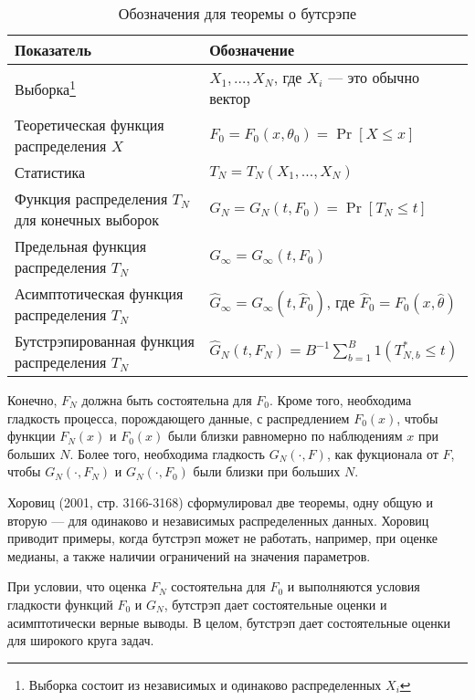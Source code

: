 \begin{table}[h]
\begin{center}
\caption{\label{tab:pred} Обозначения для теоремы о бутсрэпе}
\begin{minipage}{\textwidth}
\begin{tabular}{ll}
\hline
\hline
Показатель & Обозначение \\ 
\hline 
Выборка\footnote{Выборка состоит из независимых и одинаково распределенных $X_i$} & $X_1, \ldots, X_N$, где $X_i$ --- это обычно вектор \\ 
Теоретическая функция распределения $X$ & $F_0 = F_0(x, \theta_0) = \Pr[X \leq x]$ \\
Статистика & $T_N = T_N(X_1, \ldots, X_N)$ \\
Функция распределения $T_N$ для конечных выборок & $G_N = G_N(t, F_0) = \Pr[T_N \leq t]$ \\
Предельная функция распределения $T_N$ & $G_{\infty} = G_{\infty}(t, F_0)$ \\
Асимптотическая функция распределения $T_N$ & $\hat{G}_{\infty} = G_{\infty}(t, \hat{F}_0)$, где $\hat{F}_0 = F_0(x, \hat{\theta})$ \\
Бутстрэпированная функция распределения $T_N$ & $\hat{G}_N(t, F_N) = B^{-1} \sum_{b=1}^B 1(T^*_{N,b} \leq t)$ \\
\hline
\hline
\end{tabular}
\end{minipage}
\end{center}
\end{table} 

Конечно, $F_N$ должна быть состоятельна для $F_0$. Кроме того, необходима гладкость процесса, порождающего данные, с распредлением $F_0(x)$, чтобы функции $F_N(x)$ и $F_0(x)$ были  близки равномерно по наблюдениям $x$ при больших $N$. Более того, необходима гладкость $G_N(\cdot,F)$, как фукционала от $F$, чтобы  $G_N(\cdot,F_N)$ и $G_N(\cdot,F_0)$ были близки при больших $N$. 

Хоровиц (2001, стр. 3166-3168) сформулировал две теоремы, одну общую и вторую --- для одинаково и независимых распределенных данных. Хоровиц приводит примеры, когда бутстрэп может не работать, например, при оценке медианы, а также наличии ограничений на  значения параметров.

При условии, что оценка $F_N$ состоятельна для $F_0$ и выполняются условия гладкости функций $F_0$ и $G_N$, бутстрэп дает состоятельные оценки и асимптотически верные выводы. В целом, бутстрэп дает состоятельные оценки для широкого круга задач.


